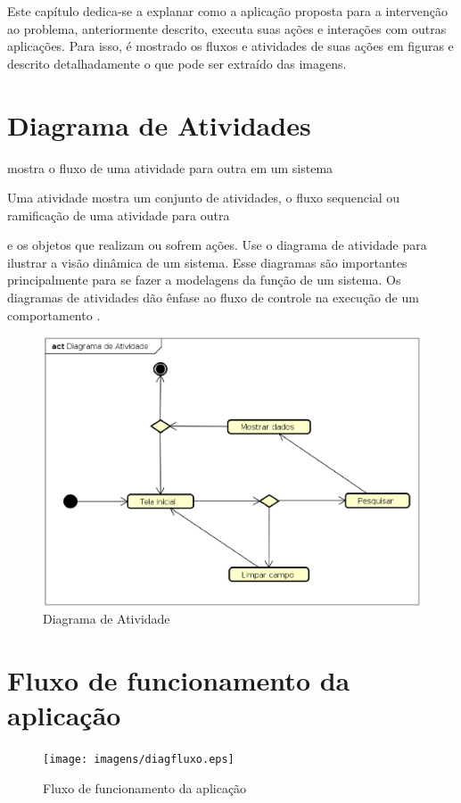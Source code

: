 Este capítulo dedica-se a explanar como a aplicação proposta para a intervenção ao problema, anteriormente descrito, executa suas ações e interações com outras aplicações. Para isso, é mostrado os fluxos e atividades de suas ações em figuras e descrito detalhadamente o que pode ser extraído das imagens.

\section{Diagrama de Atividades}
mostra o fluxo de uma atividade para outra em um sistema

Uma atividade mostra um conjunto de atividades, o fluxo sequencial ou ramificação de uma atividade para outra

e os objetos que realizam ou sofrem ações. Use o diagrama de atividade para ilustrar a visão dinâmica de um sistema. Esse diagramas são importantes principalmente para se fazer a modelagens da função de um sistema. Os diagramas de atividades dão ênfase ao fluxo de controle na execução de um comportamento \cite{Booch:2012}.

\begin{figure}[!htb]
        \caption{\label{diagrama1}Diagrama de Atividade}
        \begin{center}
                \includegraphics[width=\textwidth]{imagens/diagact.eps}
        \end{center}
\end{figure}

\section{Fluxo de funcionamento da aplicação}

\begin{figure}[!htb]
        \caption{\label{diagrama1}Fluxo de funcionamento da aplicação}
        \begin{center}
                \texttt{[image: imagens/diagfluxo.eps]}
        \end{center}
\end{figure}
